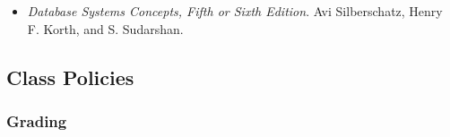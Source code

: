 \documentclass[11pt]{article} %
\begin{document}


\begin{itemize}
\item {\em Database Systems Concepts, Fifth or Sixth Edition}. Avi Silberschatz, Henry F. Korth, and S. Sudarshan.
\end{itemize}







\subsection*{Class Policies}

\subsubsection*{Grading}
\end{document}
